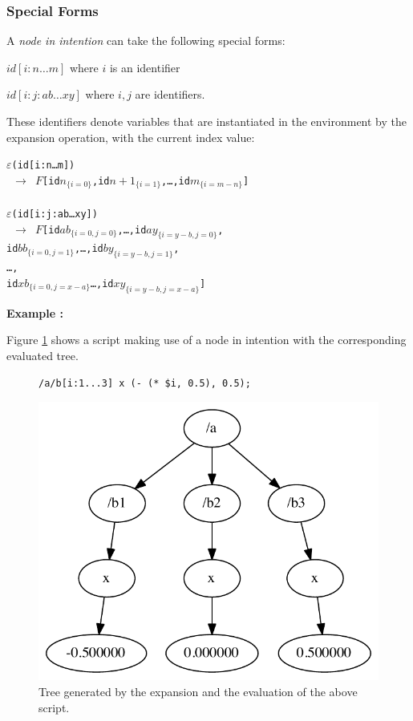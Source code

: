 \documentclass{article}
\newcommand{\exemple}	{\vspace*{1mm}\hspace*{-4mm}\textbf{Example :}}
\newcommand{\code}	[2][0.9]		{\vspace{0mm}\begin{center}\colorbox{mygrey}{
							\begin{minipage}[t]{#1\columnwidth} 
							{\small \texttt{#2}}
							\end{minipage}}\end{center}}
\newcommand{\foret}		{\ensuremath{F}}
\newcommand{\nexpand}	{\ensuremath{\varepsilon}}
\newcommand{\uld}		{\hspace*{9mm}}
\begin{document}
\subsubsection{Special Forms}

A \emph{node in intention} can take the following special forms: 
\begin{description}
\item $id[i:n…m]$ 	where $i$ is an identifier
\item $id[i:j:ab…xy]$ where $i,j$ are identifiers.
\end{description}
These identifiers denote variables that are instantiated in the environment by the expansion operation, with the current index value:
\code{\nexpand(id[i:n…m]) \\
\ $\to$ \foret [id$n_{\{i=0\}}$,id$n+1_{\{i=1\}}$,…,id$m_{\{i=m-n\}}$]\\
\\
\nexpand(id[i:j:ab…xy]) \\
\ $\to$ \foret [id$ab_{\{i=0,j=0\}}$,…,id$ay_{\{i=y-b,j=0\}}$,\\
\uld id$bb_{\{i=0,j=1\}}$,…,id$by_{\{i=y-b,j=1\}}$,\\
\uld …,\\
\uld id$xb_{\{i=0,j=x-a\}}$…,id$xy_{\{i=y-b,j=x-a\}}$]
}

\exemple

Figure \ref{treesample3} shows a script making use of a node in intention with the corresponding evaluated tree.

\begin{figure}[htbp]
\code{/a/b[i:1...3] x (- (* \$i, 0.5), 0.5);}
\begin{center}
\includegraphics[width=0.8\columnwidth]{eval/sample2}
\caption{Tree generated by the expansion and the evaluation of the above script.}
\label{treesample3}
\end{center}
\end{figure}
\end{document}

